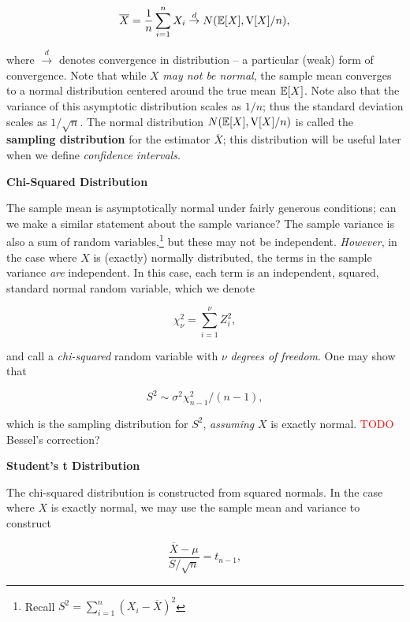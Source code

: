 \documentclass[../primer.tex]{subfiles}
\begin{document}
\begin{equation} \label{eq:mean-clt}
  \overline{X} = \frac{1}{n}\sum_{i=1}^n X_i \stackrel{d}{\to} N(\mathbb{E}[X], \mathrm{V}[X]/n),
\end{equation}

\noindent where $\stackrel{d}{\to}$ denotes convergence in distribution -- a
particular (weak) form of convergence. Note that while $X$ \emph{may not be
  normal}, the sample mean converges to a normal distribution centered around
the true mean $\mathbb{E}[X]$. Note also that the variance of this asymptotic
distribution scales as $1/n$; thus the standard deviation scales as
$1/\sqrt{n}$. The normal distribution $N(\mathbb{E}[X], \mathrm{V}[X]/n)$ is called the
\textbf{sampling distribution} for the estimator $\overline{X}$; this
distribution will be useful later when we define \emph{confidence intervals}.

\noindent\textbf{Chi-Squared Distribution}

The sample mean is asymptotically normal under fairly generous conditions; can
we make a similar statement about the sample variance? The sample variance is
also a sum of random variables,\footnote{Recall $S^2 = \sum_{i=1}^n (X_i -
  \overline{X})^2$} but these may not be independent. \emph{However}, in the
case where $X$ is (exactly) normally distributed, the terms in the sample
variance \emph{are} independent. In this case, each term is an independent,
squared, standard normal random variable, which we denote

\begin{equation} \label{eq:chi-squared}
  \chi^2_{\nu} = \sum_{i=1}^{\nu} Z_i^2,
\end{equation}

\noindent and call a \emph{chi-squared} random variable with $\nu$ \emph{degrees
  of freedom}. One may show that

\begin{equation} \label{eq:sample-dist-var}
  S^2 \sim \sigma^2 \chi^2_{n-1} / (n-1),
\end{equation}

\noindent which is the sampling distribution for $S^2$, \emph{assuming} $X$ is
exactly normal. \textcolor{red}{TODO} Bessel's correction?

\noindent\textbf{Student's t Distribution}

The chi-squared distribution is constructed from squared normals. In the case
where $X$ is exactly normal, we may use the sample mean and variance to
construct

\begin{equation} \label{eq:t-def}
  \frac{\overline{X} - \mu}{S/\sqrt{n}} = t_{n-1},
\end{equation}
\end{document}
